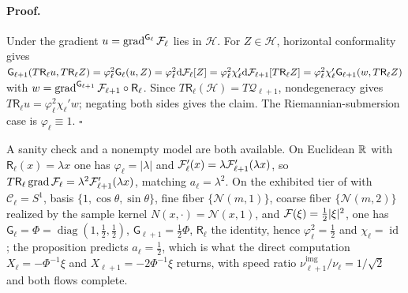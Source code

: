 \paragraph{Proof.}
Under  the gradient
$u=\operatorname{grad}^{\mathsf G_\ell}\mathcal F_\ell$ lies in $\mathcal H$.  For
$Z\in\mathcal H$, horizontal conformality gives
$\mathsf G_{\ell+1}(T\mathsf R_\ell u,T\mathsf R_\ell Z)
=\varphi_\ell^2\mathsf G_\ell(u,Z)
=\varphi_\ell^2\mathrm d\mathcal F_\ell[Z]
=\varphi_\ell^2\chi_\ell'\mathrm d\mathcal F_{\ell+1}[T\mathsf R_\ell Z]
=\varphi_\ell^2\chi_\ell'\mathsf G_{\ell+1}(w,T\mathsf R_\ell Z)$
with
$w=\operatorname{grad}^{\mathsf G_{\ell+1}}\mathcal F_{\ell+1}\circ\mathsf R_\ell$.
Since $T\mathsf R_\ell(\mathcal H)=T\mathcal Q_{\ell+1}$, nondegeneracy gives
$T\mathsf R_\ell u=\varphi_\ell^2\chi_\ell'w$; negating both sides gives the
claim.  The Riemannian-submersion case is $\varphi_\ell\equiv1$.  $\square$

A sanity check and a nonempty model are both available.  On Euclidean $\mathbb R$ with
$\mathsf R_\ell(x)=\lambda x$ one has $\varphi_\ell=|\lambda|$ and
$\mathcal F_\ell'(x)=\lambda\mathcal F_{\ell+1}'(\lambda x)$, so
$T\mathsf R_\ell\operatorname{grad}\mathcal F_\ell
=\lambda^2\mathcal F_{\ell+1}'(\lambda x)$, matching
$a_\ell=\lambda^2$.  On the exhibited tier of
 with $\mathcal C_\ell=S^1$, basis
$\{1,\cos\theta,\sin\theta\}$, fine fiber $\{\mathcal N(m,1)\}$, coarse fiber
$\{\mathcal N(m,2)\}$ realized by the sample kernel
$N(x,\cdot)=\mathcal N(x,1)$, and $\mathcal F(\xi)=\tfrac12|\xi|^2$, one has
$\mathsf G_\ell=\Phi=\operatorname{diag}(1,\tfrac12,\tfrac12)$,
$\mathsf G_{\ell+1}=\tfrac12\Phi$, $\mathsf R_\ell$ the identity, hence
$\varphi_\ell^2=\tfrac12$ and $\chi_\ell=\operatorname{id}$; the proposition
predicts $a_\ell=\tfrac12$, which is what the direct computation
$X_\ell=-\Phi^{-1}\xi$ and $X_{\ell+1}=-2\Phi^{-1}\xi$ returns, with speed
ratio $\nu^{\mathrm{img}}_{\ell+1}/\nu_\ell=1/\sqrt2$ and both flows complete.

